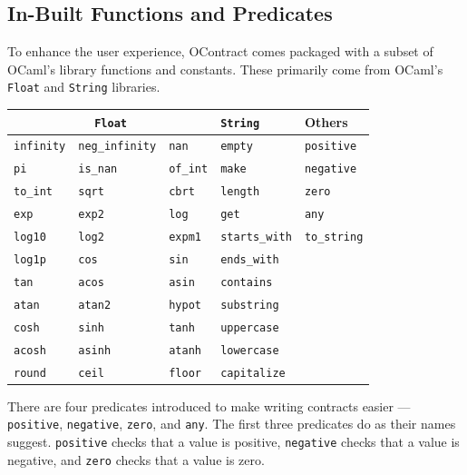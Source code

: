 \documentclass[a4paper]{article}
\begin{document}
\subsection{In-Built Functions and Predicates}

To enhance the user experience, OContract comes packaged with a subset of OCaml's library functions and constants.
These primarily come from OCaml's \texttt{Float} and \texttt{String} libraries.

\begin{center}
\begin{tabular}{|l|l|l|l|l|}
    \hline
    \multicolumn{3}{|c|}{\texttt{Float}} & \texttt{String} & Others \\ \hline
    \texttt{infinity} & \texttt{neg\_infinity} & \texttt{nan} & \texttt{empty} & \texttt{positive} \\
    \texttt{pi} & \texttt{is\_nan} & \texttt{of\_int} & \texttt{make} & \texttt{negative} \\
    \texttt{to\_int} & \texttt{sqrt} & \texttt{cbrt} & \texttt{length} & \texttt{zero} \\
    \texttt{exp} & \texttt{exp2} & \texttt{log} & \texttt{get} & \texttt{any} \\
    \texttt{log10} & \texttt{log2} & \texttt{expm1} & \texttt{starts\_with} & \texttt{to\_string} \\
    \texttt{log1p} & \texttt{cos} & \texttt{sin} & \texttt{ends\_with} & \\
    \texttt{tan} & \texttt{acos} & \texttt{asin} & \texttt{contains} & \\
    \texttt{atan} & \texttt{atan2} & \texttt{hypot} & \texttt{substring} & \\
    \texttt{cosh} & \texttt{sinh} & \texttt{tanh} & \texttt{uppercase} & \\
    \texttt{acosh} & \texttt{asinh} & \texttt{atanh} & \texttt{lowercase} & \\
    \texttt{round} & \texttt{ceil} & \texttt{floor} & \texttt{capitalize} & \\ \hline
\end{tabular}
\end{center}

There are four predicates introduced to make writing contracts easier --- \texttt{positive}, \texttt{negative}, \texttt{zero}, and \texttt{any}.
The first three predicates do as their names suggest.
\texttt{positive} checks that a value is positive, \texttt{negative} checks that a value is negative, and \texttt{zero} checks that a value is zero.
\end{document}
